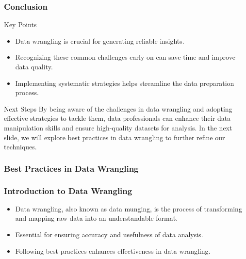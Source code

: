 \documentclass[aspectratio=169]{beamer}
\begin{document}
\begin{frame}[fragile]
    \frametitle{Conclusion}
    \begin{block}{Key Points}
        \begin{itemize}
            \item Data wrangling is crucial for generating reliable insights.
            \item Recognizing these common challenges early on can save time and improve data quality.
            \item Implementing systematic strategies helps streamline the data preparation process.
        \end{itemize}
    \end{block}
    \begin{block}{Next Steps}
        By being aware of the challenges in data wrangling and adopting effective strategies to tackle them, data professionals can enhance their data manipulation skills and ensure high-quality datasets for analysis. In the next slide, we will explore best practices in data wrangling to further refine our techniques.
    \end{block}
\end{frame}

\begin{frame}
    \frametitle{Best Practices in Data Wrangling}
    \frametitle{Introduction to Data Wrangling}
    \begin{itemize}
        \item Data wrangling, also known as data munging, is the process of transforming and mapping raw data into an understandable format.
        \item Essential for ensuring accuracy and usefulness of data analysis.
        \item Following best practices enhances effectiveness in data wrangling.
    \end{itemize}
\end{frame}
\end{document}
